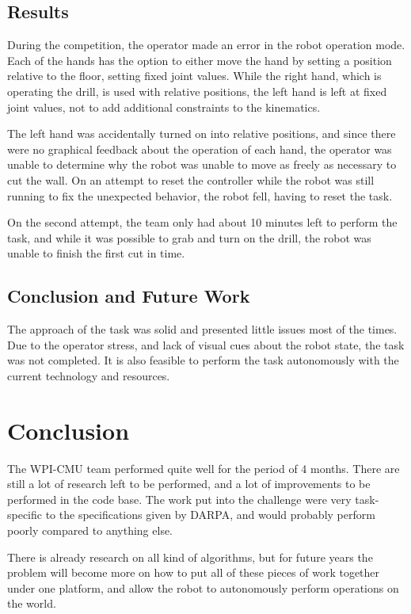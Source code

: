 \documentclass{article}
\begin{document}
\subsection{Results}
During the competition, the operator made an error in the robot operation mode. Each of the hands has the option to either move the hand by setting a position relative to the floor, setting fixed joint values. While the right hand, which is operating the drill, is used with relative positions, the left hand is left at fixed joint values, not to add additional constraints to the kinematics. 

The left hand was accidentally turned on into relative positions, and since there were no graphical feedback about the operation of each hand, the operator was unable to determine why the robot was unable to move as freely as necessary to cut the wall. On an attempt to reset the controller while the robot was still running to fix the unexpected behavior, the robot fell, having to reset the task. 

On the second attempt, the team only had about 10 minutes left to perform the task, and while it was possible to grab and turn on the drill, the robot was unable to finish the first cut in time.

\subsection{Conclusion and Future Work}

The approach of the task was solid and presented little issues most of the times. Due to the operator stress, and lack of visual cues about the robot state, the task was not completed. It is also feasible to perform the task autonomously with the current technology and resources. 

\section{Conclusion}

The WPI-CMU team performed quite well for the period of 4 months. There are still a lot of research left to be performed, and a lot of improvements to be performed in the code base. The work put into the challenge were very task-specific to the specifications given by DARPA, and would probably perform poorly compared to anything else. 


There is already research on all kind of algorithms, but for future years the problem will become more on how to put all of these pieces of work together under one platform, and allow the robot to autonomously perform operations on the world. 
\end{document}
